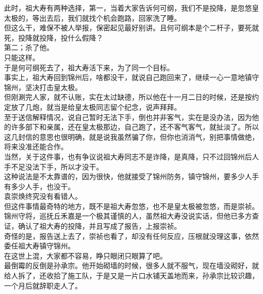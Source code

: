 \begin{multicols}{\theparacolNo}
此时，祖大寿有两种选择，第一，当着大家告诉何可纲，我们不是投降，是忽悠皇太极的，等出去后，我们就找个机会跑路，回家洗了睡。\\

但这么干，难保不被人举报，保密起见最好别讲。且何可纲本是个二杆子，要死就死，投降就投降，投什么假降？\\

第二；杀了他。\\

只能这样。\\

于是何可纲死去了，祖大寿活下来，为了同一个目标。\\

事实上，祖大寿回到锦州后，啥都没干，就说自己跑回来了，继续一心一意地镇守锦州，坚决打击皇太极。\\

但刚涮完人家，就不认账，实在太过缺德，所以他在十一月二日的时候，还是按约定放了几炮，就当是给皇太极同志留个纪念，说声拜拜。\\

至于送信解释情况，说自己暂时无法下手，倒也并非客气，实在是没办法，因为他的许多部下和亲属，还在皇太极那边，自己跑了，还不客气客气，就扯淡了。所以这几封信的意思也很明确，就是说我虽然骗了你，但你也消消气，别把事情做绝，将来没准还能合作。\\

当然，关于这件事，也有争议说祖大寿同志不是诈降，是真降，只不过回锦州后人手不足没法下手，所以才没干。\\

这种说法是不太靠谱的，因为很快，他就接受了锦州防务，镇守锦州，要多少人手有多少人手，也没干。\\

袁崇焕终究没有看错人。\\

但这件事情最奇特的地方，既不是祖大寿忽悠，也不是皇太极被忽悠，而是崇祯。\\

锦州守将，巡抚丘禾嘉是一个极其谨慎的人，虽然祖大寿没说实话，但他已多方查证，确认了祖大寿的投降，并且写成了报告，上报崇祯。\\

奇怪的是，报告送上去了，崇祯也看了，却没有任何反应，压根就没理这事，依然委任祖大寿镇守锦州。\\

在这世上混，大家都不容易，睁只眼闭只眼算了吧。\\

最倒霉的反倒是孙承宗。他开始砌墙的时候，很多人就不服气，现在墙没砌好，就给人拆了，还收拾了施工队，于是又是一片口水铺天盖地而来，孙承宗比较识趣，一个月后就辞职走人了。\\


\end{multicols}
